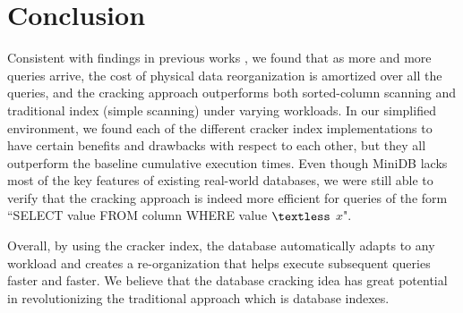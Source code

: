\section{Conclusion}
Consistent with findings in previous works \cite{idreos_2007, schuhknecht_2014}, we found that as more and more queries arrive, the cost of physical data reorganization is amortized over all the queries, and the cracking approach outperforms both sorted-column scanning and traditional index (simple scanning) under varying workloads. In our simplified environment, we found each of the different cracker index implementations to have certain benefits and drawbacks with respect to each other, but they all outperform the baseline cumulative execution times. Even though MiniDB lacks most of the key features of existing real-world databases, we were still able to verify that the cracking approach is indeed more efficient for queries of the form ``SELECT value  FROM column WHERE value  $\textless$ $x$". 

Overall, by using the cracker index, the database automatically adapts to any workload and creates a re-organization that helps execute subsequent queries faster and faster. We believe that the database cracking idea has great potential in revolutionizing the traditional approach which is database indexes.
\label{sec:conclusion}

